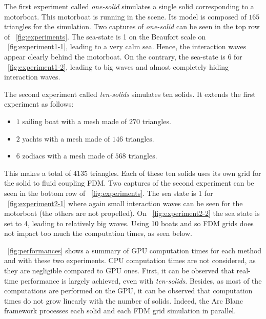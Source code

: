 \documentclass[final]{jcgt}
\def\framework{the Arc Blanc framework\xspace}
\begin{document}
The first experiment called \emph{one-solid} simulates a single solid corresponding to a motorboat.
This motorboat is running in the scene.
Its model is composed of $165$ triangles for the simulation. 
Two captures of \emph{one-solid} can be seen in the top row of \figurename~\ref{fig:experiments}.
The sea-state is 1 on the Beaufort scale on \figurename~\ref{fig:experiment1-1}, leading to a very calm sea.
Hence, the interaction waves appear clearly behind the motorboat. 
On the contrary, the sea-state is 6 for \figurename~\ref{fig:experiment1-2}, leading to big waves and almost completely hiding interaction waves.

The second experiment called \emph{ten-solids} simulates ten solids.
It extends the first experiment as follows:
\begin{itemize}
	\item $1$ sailing boat with a mesh made of $270$ triangles.
	\item $2$ yachts with a mesh made of $146$ triangles.
	\item $6$ zodiacs with a mesh made of $568$ triangles.
\end{itemize} 
This makes a total of $4135$ triangles. 
Each of these ten solids uses its own grid for the solid to fluid coupling FDM. 
Two captures of the second experiment can be seen in the bottom row of \figurename~\ref{fig:experiments}.
The sea state is 1 for \figurename~\ref{fig:experiment2-1} where again small interaction waves can be seen for the motorboat (the others are not propelled). 
On \figurename~\ref{fig:experiment2-2} the sea state is set to 4, leading to relatively big waves.
Using 10 boats and so FDM grids does not impact too much the computation times, as seen below.

\tablename~\ref{fig:performances} shows a summary of GPU computation times for each method and with these two experiments. 
CPU computation times are not considered, as they are negligible compared to GPU ones. 
First, it can be observed that real-time performance is largely achieved, even with \emph{ten-solids}. 
Besides, as most of the computations are performed on the GPU, it can be observed that computation times do not grow linearly with the number of solids. 
Indeed, \framework processes each solid and each FDM grid simulation in parallel.
\end{document}
